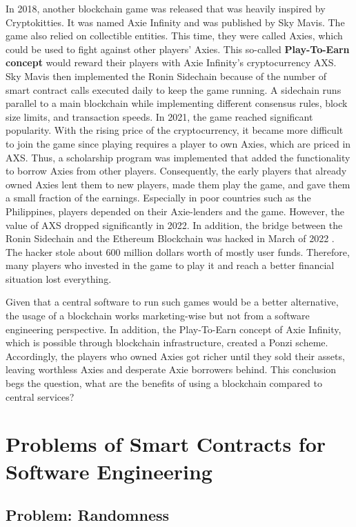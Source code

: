 In 2018, another blockchain game was released that was heavily inspired by Cryptokitties. 
It was named Axie Infinity and was published by Sky Mavis.
The game also relied on collectible entities. 
This time, they were called Axies, which could be used to fight against other players' Axies.
This so-called \textbf{Play-To-Earn concept} would reward their players with Axie Infinity's cryptocurrency AXS.
Sky Mavis then implemented the Ronin Sidechain because of the number of smart contract calls executed daily to keep the game running.
A sidechain runs parallel to a main blockchain while implementing different consensus rules, block size limits, and transaction speeds. \cite{axie_analysis}
In 2021, the game reached significant popularity.
With the rising price of the cryptocurrency, it became more difficult to join the game since playing requires a player to own Axies, which are priced in AXS.
Thus, a scholarship program was implemented that added the functionality to borrow Axies from other players.
Consequently, the early players that already owned Axies lent them to new players, made them play the game, and gave them a small fraction of the earnings.
Especially in poor countries such as the Philippines, players depended on their Axie-lenders and the game.
However, the value of AXS dropped significantly in 2022.
In addition, the bridge between the Ronin Sidechain and the Ethereum Blockchain was hacked in March of 2022 \cite{axie_collapse}.
The hacker stole about 600 million dollars worth of mostly user funds.
Therefore, many players who invested in the game to play it and reach a better financial situation lost everything. \cite{axie_article}

Given that a central software to run such games would be a better alternative, the usage of a blockchain works marketing-wise but not from a software engineering perspective.
In addition, the Play-To-Earn concept of Axie Infinity, which is possible through blockchain infrastructure, created a Ponzi scheme.
Accordingly, the players who owned Axies got richer until they sold their assets, leaving worthless Axies and desperate Axie borrowers behind.
This conclusion begs the question, what are the benefits of using a blockchain compared to central services?

\section{Problems of Smart Contracts for Software Engineering}

\subsection{Problem: Randomness}

